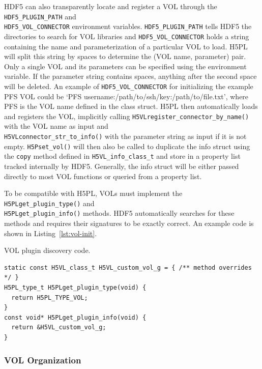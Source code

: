 HDF5 can also transparently locate and register a VOL through the \texttt{HDF5\_PLUGIN\_PATH} and \\ \texttt{HDF5\_VOL\_CONNECTOR} environment variables. \texttt{HDF5\_PLUGIN\_PATH} tells HDF5 the directories to search for VOL libraries and \texttt{HDF5\_VOL\_CONNECTOR} holds a string containing the name and parameterization of a particular VOL to load. H5PL will split this string by spaces to determine the (VOL name, parameter) pair. Only a single VOL and its parameters can be specified using the environment variable. If the parameter string contains spaces, anything after the second space will be deleted. An example of \texttt{HDF5\_VOL\_CONNECTOR} for initializing the example PFS VOL could be `PFS username:/path/to/ssh/key:/path/to/file.txt', where PFS is the VOL name defined in the class struct. H5PL then automatically loads and registers the VOL, implicitly calling \texttt{H5VLregister\_connector\_by\_name()} with the VOL name as input and \\ \texttt{H5VLconnector\_str\_to\_info()} with the parameter string as input if it is not empty. \texttt{H5Pset\_vol()} will then also be called to duplicate the info struct using the \texttt{copy} method defined in \texttt{H5VL\_info\_class\_t} and store in a property list tracked internally by HDF5. Generally, the info struct will be either passed directly to most VOL functions or queried from a property list.

To be compatible with H5PL, VOLs must implement the \texttt{H5PLget\_plugin\_type()} and \\ \texttt{H5PLget\_plugin\_info()} methods. HDF5 automatically searches for these methods and requires their signatures to be exactly correct. An example code is shown in Listing~\ref{lst:vol-init}.

\begin{listing}[!ht]
\centering
\caption{VOL plugin discovery code.}
\label{lst:vol-init}
\begin{verbatim}
static const H5VL_class_t H5VL_custom_vol_g = { /** method overrides */ }
H5PL_type_t H5PLget_plugin_type(void) {
  return H5PL_TYPE_VOL;
}
const void* H5PLget_plugin_info(void) {
  return &H5VL_custom_vol_g;
}
\end{verbatim}
\end{listing}

\subsubsection{VOL Organization}

